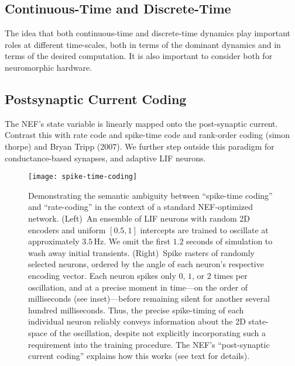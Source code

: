 \subsection{Continuous-Time and Discrete-Time}

The idea that both continuous-time and discrete-time dynamics play important roles at different time-scales, both in terms of the dominant dynamics and in terms of the desired computation.
It is also important to consider both for neuromorphic hardware.

\subsection{Postsynaptic Current Coding}
\label{sec:psc-coding}

The NEF's state variable is linearly mapped onto the post-synaptic current.
Contrast this with rate code and spike-time code and rank-order coding (simon thorpe) and Bryan Tripp (2007).
We further step outside this paradigm for conductance-based synapses, and adaptive LIF neurons.


\begin{figure}
    \centering
    \texttt{[image: spike-time-coding]}
     
    \caption{\label{fig:spike-time-coding} 
      Demonstrating the semantic ambiguity between ``spike-time coding'' and ``rate-coding'' in the context of a standard NEF-optimized network.
      (Left)~An ensemble of  LIF neurons with random 2D encoders and uniform $[0.5, 1]$ intercepts are trained to oscillate at approximately $3.5$\,Hz.
      We omit the first $1.2$ seconds of simulation to wash away initial transients.
      (Right)~Spike rasters of  randomly selected neurons, ordered by the angle of each neuron's respective encoding vector.
      Each neuron spikes only $0$, $1$, or $2$ times per oscillation, and at a precise moment in time---on the order of milliseconds (see inset)---before remaining silent for another several hundred milliseconds.
      Thus, the precise spike-timing of each individual neuron reliably conveys information about the 2D state-space of the oscillation, despite not explicitly incorporating such a requirement into the training procedure.
      The NEF's ``post-synaptic current coding'' explains how this works (see text for details).
    }
\end{figure}

